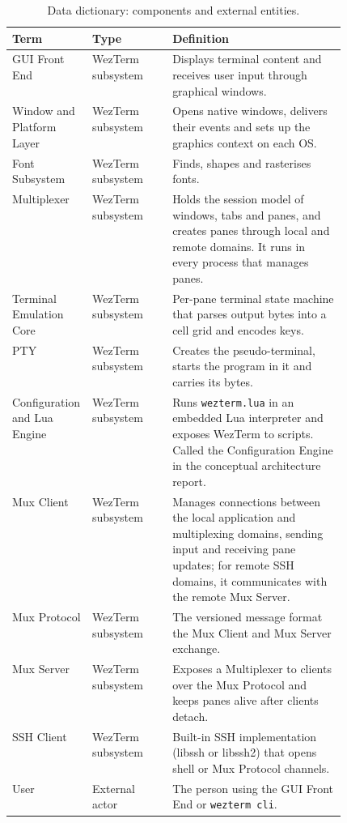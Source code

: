 \begin{table}[!htbp]
  \centering
  \caption{Data dictionary: components and external entities.}
  \label{tab:data-dictionary}
  \small
  \begin{tabularx}{\linewidth}{@{}>{\raggedright\arraybackslash}p{0.24\linewidth}>{\raggedright\arraybackslash}p{0.24\linewidth}X@{}}
    \toprule
    \textbf{Term} & \textbf{Type} & \textbf{Definition} \\
    \midrule
    GUI Front End & WezTerm subsystem & Displays terminal content and receives user input through graphical windows. \\
    Window and Platform Layer & WezTerm subsystem & Opens native windows, delivers their events and sets up the graphics context on each OS. \\
    Font Subsystem & WezTerm subsystem & Finds, shapes and rasterises fonts. \\
    Multiplexer & WezTerm subsystem & Holds the session model of windows, tabs and panes, and creates panes through local and remote domains. It runs in every process that manages panes. \\
    Terminal Emulation Core & WezTerm subsystem & Per-pane terminal state machine that parses output bytes into a cell grid and encodes keys. \\
    PTY & WezTerm subsystem & Creates the pseudo-terminal, starts the program in it and carries its bytes. \\
    Configuration and Lua Engine & WezTerm subsystem & Runs \texttt{wezterm.lua} in an embedded Lua interpreter and exposes WezTerm to scripts. Called the Configuration Engine in the conceptual architecture report. \\
    Mux Client & WezTerm subsystem & Manages connections between the local application and multiplexing domains, sending input and receiving pane updates; for remote SSH domains, it communicates with the remote Mux Server. \\
    Mux Protocol & WezTerm subsystem & The versioned message format the Mux Client and Mux Server exchange. \\
    Mux Server & WezTerm subsystem & Exposes a Multiplexer to clients over the Mux Protocol and keeps panes alive after clients detach. \\
    SSH Client & WezTerm subsystem & Built-in SSH implementation (libssh or libssh2) that opens shell or Mux Protocol channels. \\
    User & External actor & The person using the GUI Front End or \texttt{wezterm cli}. \\

\end{tabularx}
\end{table}

